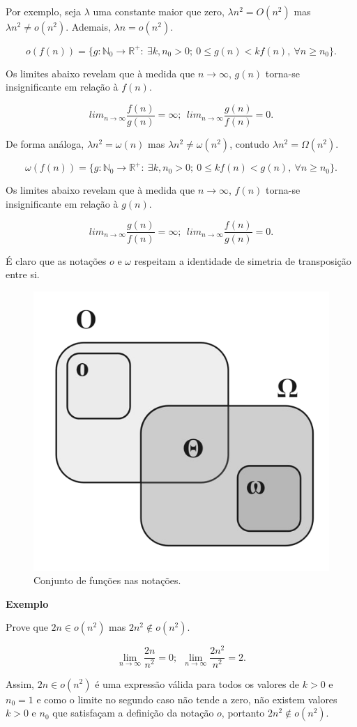 Por exemplo, seja $\lambda$ uma constante maior que zero, $\lambda n^2 = O(n^2)$ mas $\lambda n^2 \neq o(n^2)$. Ademais, $\lambda n = o(n^2)$.

\[o(f(n)) = \{g: \mathbb{N}_0 \rightarrow \mathbb{R}^{+}: \ \exists k, n_0 > 0 ; \ 0\leq g(n) < kf(n), \ \forall n \geq n_0\}.\]

Os limites abaixo revelam que à medida que $n \rightarrow \infty$, $g(n)$ torna-se insignificante em relação à $f(n)$.

\[lim_{n\rightarrow\infty} \frac{f(n)}{g(n)}=\infty; \ \ lim_{n\rightarrow\infty} \frac{g(n)}{f(n)}=0.\]

De forma análoga, $\lambda n^2 = \omega(n)$ mas $\lambda n^2 \neq \omega(n^2)$, contudo $\lambda n^2 = \Omega(n^2)$.

\[\omega(f(n)) = \{g: \mathbb{N}_0 \rightarrow \mathbb{R}^{+}:  \ \exists k, n_0 > 0 ; \ 0\leq kf(n) < g(n), \ \forall n \geq n_0\} .\]

Os limites abaixo revelam que à medida que $n \rightarrow \infty$, $f(n)$ torna-se insignificante em relação à $g(n)$.

\[lim_{n\rightarrow\infty} \frac{g(n)}{f(n)}=\infty; \ \ lim_{n\rightarrow\infty} \frac{f(n)}{g(n)}=0.\]

É claro que as notações $o$ e $\omega$ respeitam a identidade de simetria de transposição entre si.

\begin{figure}
  \centering
  \includegraphics[width=0.4\linewidth]{img/conjuntonotacoes.png}
    \caption{Conjunto de funções nas notações.}
    \label{conjuntonotacoes}
\end{figure}

\textbf{Exemplo}

Prove que $2n\in o(n^2)$ mas $2n^2\notin o(n^2)$.

\[\lim_{n\rightarrow\infty}\frac{2n}{n^2}=0; \ \ \lim_{n\rightarrow\infty}\frac{2n^2}{n^2}=2.\]

Assim, $2n\in o(n^2)$ é uma expressão válida para todos os valores de $k>0$ e $n_0=1$ e como o limite no segundo caso não tende a zero, não existem valores $k>0$ e $n_0$ que satisfaçam a definição da notação $o$, portanto $2n^2\notin o(n^2)$.

